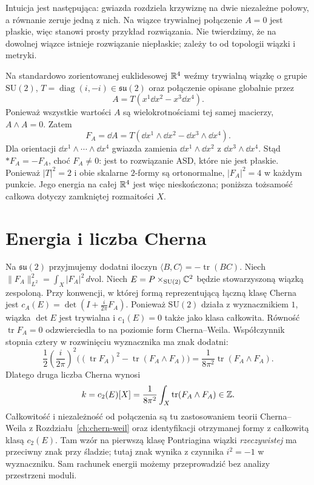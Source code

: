 Intuicja jest następująca: gwiazda rozdziela
krzywiznę na dwie niezależne połowy, a równanie
zeruje jedną z nich. Na wiązce trywialnej połączenie
$A=0$ jest płaskie, więc stanowi prosty przykład
rozwiązania.
Nie twierdzimy, że na dowolnej wiązce istnieje
rozwiązanie niepłaskie; zależy to od topologii
wiązki i metryki.

\begin{przyklad}
\label{prz:donaldson-asd-lokalny}
Na standardowo zorientowanej euklidesowej $\mathbb{R}^4$
weźmy trywialną wiązkę o grupie $\mathrm{SU}(2)$,
$T=\operatorname{diag}(i,-i)\in\mathfrak{su}(2)$
oraz połączenie opisane globalnie przez
\[
 A=T(x^1\dd x^2-x^3\dd x^4).
\]
Ponieważ wszystkie wartości $A$ są wielokrotnościami
tej samej macierzy, $A\wedge A=0$. Zatem
\[
 F_A=\dd A
   =T(\dd x^1\wedge\dd x^2
       -\dd x^3\wedge\dd x^4).
\]
Dla orientacji $\dd x^1\wedge\cdots\wedge\dd x^4$
gwiazda zamienia $\dd x^1\wedge\dd x^2$
z $\dd x^3\wedge\dd x^4$. Stąd $*F_A=-F_A$,
choć $F_A\ne0$: jest to rozwiązanie ASD, które
nie jest płaskie. Ponieważ $|T|^2=2$ i obie
skalarne $2$-formy są ortonormalne, $|F_A|^2=4$
w każdym punkcie. Jego energia na całej $\mathbb{R}^4$
jest więc nieskończona; poniższa tożsamość
całkowa dotyczy zamkniętej rozmaitości $X$.
\end{przyklad}

\section{Energia i liczba Cherna}
\label{sec:donaldson-energia}

Na $\mathfrak{su}(2)$ przyjmujemy dodatni iloczyn
$\langle B,C\rangle=-\operatorname{tr}(BC)$.
Niech $\|F_A\|_{L^2}^2=\int_X|F_A|^2\,d\mathrm{vol}$.
Niech $E=P\times_{\mathrm{SU}(2)}\mathbb{C}^2$ będzie
stowarzyszoną wiązką zespoloną. Przy konwencji,
w której formą reprezentującą łączną klasę Cherna
jest $c_A(E)=\det(I+\frac{i}{2\pi}F_A)$.
Ponieważ $\mathrm{SU}(2)$ działa z wyznacznikiem $1$,
wiązka $\det E$ jest trywialna i $c_1(E)=0$ także
jako klasa całkowita. Równość $\operatorname{tr}F_A=0$
odzwierciedla to na poziomie form Cherna--Weila.
Współczynnik stopnia cztery w rozwinięciu wyznacznika
ma znak dodatni:
\[
 \frac12\left(\frac{i}{2\pi}\right)^2
 \bigl((\operatorname{tr}F_A)^2
       -\operatorname{tr}(F_A\wedge F_A)\bigr)
 =\frac{1}{8\pi^2}\operatorname{tr}(F_A\wedge F_A).
\]
Dlatego druga liczba Cherna wynosi
\begin{equation}\label{eq:donaldson-c2}
 k=c_2(E)[X]
   =\frac{1}{8\pi^2}\int_X\operatorname{tr}(F_A\wedge F_A)
   \in\mathbb{Z}.
\end{equation}
Całkowitość i niezależność od połączenia są tu
zastosowaniem teorii Cherna--Weila z
Rozdziału~\ref{ch:chern-weil} oraz identyfikacji
otrzymanej formy z całkowitą klasą $c_2(E)$.
Tam wzór na pierwszą klasę Pontriagina wiązki
\emph{rzeczywistej} ma przeciwny znak przy śladzie;
tutaj znak wynika z czynnika $i^2=-1$ w wyznaczniku.
Sam rachunek energii możemy przeprowadzić bez
analizy przestrzeni moduli.


